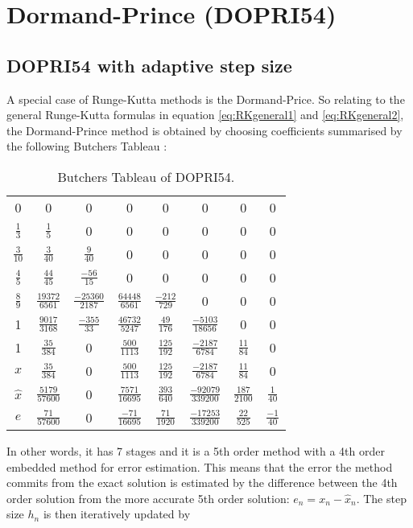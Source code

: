 \section{Dormand-Prince (DOPRI54)}
\subsection{DOPRI54 with adaptive step size}
A special case of Runge-Kutta methods is the Dormand-Price. So relating to the general Runge-Kutta formulas in equation \ref{eq:RKgeneral1} and \ref{eq:RKgeneral2}, the Dormand-Prince method is obtained by choosing coefficients summarised by the following Butchers Tableau \cite{JrgensenRunge-KuttaEquations}:

\begin{table}[H]
\centering
\begin{tabular}{c|ccccccc}
0 & 0 & 0 & 0 & 0 & 0 & 0 & 0 \\
$\frac{1}{3}$ & $\frac{1}{5}$ & 0 & 0 & 0 & 0 & 0 & 0 \\
$\frac{3}{10}$ & $\frac{3}{40}$ & $\frac{9}{40}$ & 0 & 0 & 0 & 0 & 0 \\
$\frac{4}{5}$ & $\frac{44}{45}$ & $\frac{-56}{15}$ & 0 & 0 & 0 & 0 & 0 \\
$\frac{8}{9}$ & $\frac{19372}{6561}$ & $\frac{-25360}{2187}$ & $\frac{64448}{6561}$ & $\frac{-212}{729}$ & 0 & 0 & 0 \\
1 & $\frac{9017}{3168}$ & $\frac{-355}{33}$ & $\frac{46732}{5247}$ & $\frac{49}{176}$ & $\frac{-5103}{18656}$ & 0 & 0 \\
1 & $\frac{35}{384}$ & 0 & $\frac{500}{1113}$ & $\frac{125}{192}$ & $\frac{-2187}{6784}$ & $\frac{11}{84}$ & 0 \\ \hline
 $x$ &  $\frac{35}{384}$ & 0 & $\frac{500}{1113}$ & $\frac{125}{192}$ & $\frac{-2187}{6784}$ & $\frac{11}{84}$ & 0  \\
$\hat{x}$ & $\frac{5179}{57600}$ & 0 & $\frac{7571}{16695}$ & $\frac{393}{640}$ & $\frac{-92079}{339200}$ & $\frac{187}{2100}$ & $\frac{1}{40}$ \\ \hline
$e$ & $\frac{71}{57600}$ & 0 & $\frac{-71}{16695}$ & $\frac{71}{1920}$ & $\frac{-17253}{339200}$ & $\frac{22}{525}$ & $\frac{-1}{40}$
\end{tabular}%
\caption{Butchers Tableau of DOPRI54.}
\end{table}

In other words, it has 7 stages and it is a 5th order method with a 4th order embedded method for error estimation. This means that the error the method commits from the exact solution is estimated by the difference between the 4th order solution from the more accurate 5th order solution: $e_n = x_n - \hat{x}_n$. The step size $h_n$ is then iteratively updated by

